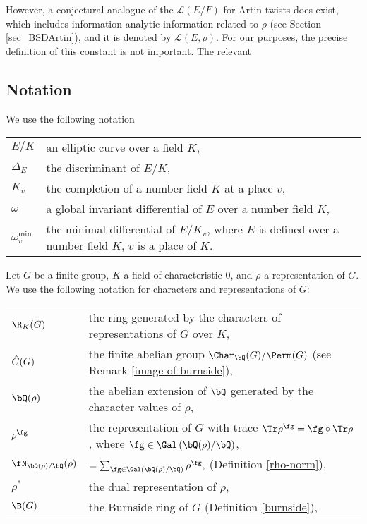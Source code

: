 However, a conjectural analogue of the $\mathcal{L}(E/F)$ for Artin twists does exist, which includes information analytic information related to $\rho$ (see Section \ref{sec_BSDArtin}), and it is denoted by $\mathcal{L}(E,\rho)$. For our purposes, the precise definition of this constant is not important. The relevant 


\subsection*{Notation}

We use the following notation\newline

\begin{tabular}{l | l}
    $E / K$ & an elliptic curve over a field $K$,\\
    $\Delta_E$ & the discriminant of $E / K$,\\
    $K_v$  & the completion of a number field $K$ at a place $v$, \\
    $\omega$ & a global invariant differential of $E$ over a number field $K$,\\
    $\omega_v^{\min}$ & the minimal differential of $E / K_{v}$, where $E$ is defined over a number field $K$, $v$ is a place of $K$. 
\end{tabular}\newline

Let $G$ be a finite group, $K$ a field of characteristic $0$, and $\rho$ a representation of $G$. We use the following notation for characters and representations of $G$:

\bigskip

\begin{tabular}{l | l}
     $\R_{K}(G)$ & the ring generated by the characters of representations of $G$ over $K$,\\
    $\hat{C}(G)$ & the finite abelian group $\Char_{\bQ}(G) / \Perm(G)$ (see Remark \ref{image-of-burnside}), \\ 
    $\bQ(\rho)$ & the abelian extension of $\bQ$ generated by the character values of $\rho$, \\
    $\rho^{\fg}$ & the representation of $G$ with trace $\Tr \rho^{\fg} = \fg \circ \Tr \rho$, where $\fg \in \Gal\left(\bQ(\rho) / \bQ\right)$,\\
    $\repnorm{\rho}$ &  $ = \sum_{\fg \in \Gal(\bQ(\rho) / \bQ)} \rho^{\fg},$ (Definition \ref{rho-norm}),\\
    $\rho^*$ & the dual representation of $\rho$,
    \\
    $\B(G)$ & the Burnside ring of $G$ (Definition \ref{burnside}), \\
\end{tabular}
\vspace{1em}

